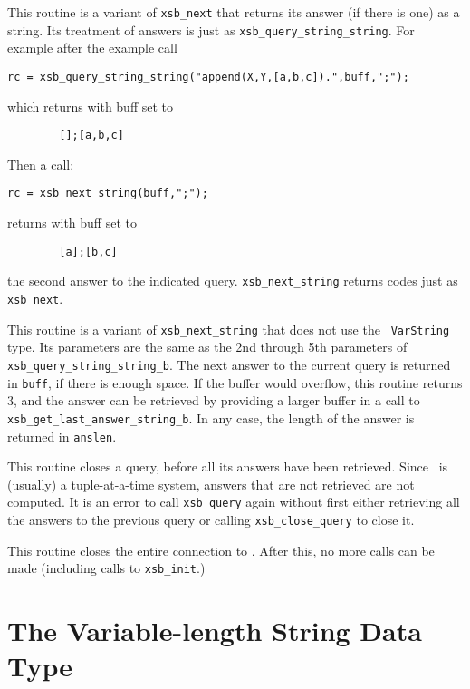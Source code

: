 \begin{description}
   This routine is a variant of {\tt xsb\_next} that
returns its answer (if there is one) as a string.  Its treatment of
answers is just as {\tt xsb\_query\_string\_string}.  For example after
the example call 
\begin{verbatim}
rc = xsb_query_string_string("append(X,Y,[a,b,c]).",buff,";");
\end{verbatim}
which returns with buff set to 
\begin{verbatim}
        [];[a,b,c]
\end{verbatim}
Then a call:
\begin{verbatim}
rc = xsb_next_string(buff,";");
\end{verbatim}
returns with buff set to 
\begin{verbatim}
        [a];[b,c]
\end{verbatim}
the second answer to the indicated query. {\tt xsb\_next\_string}
returns codes just as {\tt xsb\_next}.

  This routine is a
variant of {\tt xsb\_next\_string} that does not use the {\tt
VarString} type.  Its parameters are the same as the 2nd through 5th
parameters of {\tt xsb\_query\_string\_string\_b}.  The next answer to
the current query is returned in \verb|buff|, if there is enough
space.  If the buffer would overflow, this routine returns 3, and the
answer can be retrieved by providing a larger buffer in a call to {\tt
xsb\_get\_last\_answer\_string\_b}.  In any case, the length of the
answer is returned in \verb|anslen|.

 
This routine closes a query, before all its answers have been
retrieved.  Since \ourprolog\ is (usually) a tuple-at-a-time system,
answers that are not retrieved are not computed.
It is an error to call {\tt xsb\_query} again without
first either retrieving all the answers to the previous query or
calling {\tt xsb\_close\_query} to close it.

 
This routine closes the entire connection to \ourprolog .  After this,
no more calls can be made (including calls to {\tt xsb\_init}.)
\end{description}

\section{The Variable-length String Data Type}\label{sec-varstring}

